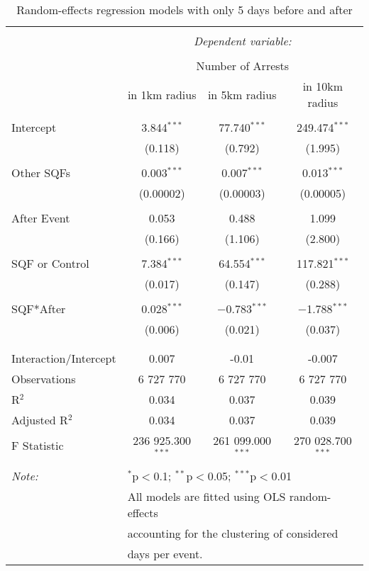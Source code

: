 
\begin{table}[!htbp] \centering 
  \caption{Random-effects regression models with only 5 days before and after} 
  \label{} 
\footnotesize 
\begin{tabular}{@{\extracolsep{4pt}}lccc} 
\\[-1.8ex]\hline 
\hline \\[-1.8ex] 
 & \multicolumn{3}{c}{\textit{Dependent variable:}} \\ 
\cline{2-4} 
\\[-1.8ex] & \multicolumn{3}{c}{Number of Arrests \vspace*{0.2cm}} \\ 
 & in 1km radius & in 5km radius & in 10km radius \\ 
\hline \\[-1.8ex] 
 Intercept & 3.844$^{***}$ & 77.740$^{***}$ & 249.474$^{***}$ \\ 
  & (0.118) & (0.792) & (1.995) \\ 
  & & & \\ 
 Other SQFs & 0.003$^{***}$ & 0.007$^{***}$ & 0.013$^{***}$ \\ 
  & (0.00002) & (0.00003) & (0.00005) \\ 
  & & & \\ 
 After Event & 0.053 & 0.488 & 1.099 \\ 
  & (0.166) & (1.106) & (2.800) \\ 
  & & & \\ 
 SQF or Control & 7.384$^{***}$ & 64.554$^{***}$ & 117.821$^{***}$ \\ 
  & (0.017) & (0.147) & (0.288) \\ 
  & & & \\ 
 SQF*After & 0.028$^{***}$ & $-$0.783$^{***}$ & $-$1.788$^{***}$ \\ 
  & (0.006) & (0.021) & (0.037) \\ 
  & & & \\ 
\hline \\[-1.8ex] 
Interaction/Intercept & 0.007 & -0.01 & -0.007 \\ 
Observations & 6 727 770 & 6 727 770 & 6 727 770 \\ 
R$^{2}$ & 0.034 & 0.037 & 0.039 \\ 
Adjusted R$^{2}$ & 0.034 & 0.037 & 0.039 \\ 
F Statistic & 236 925.300$^{***}$ & 261 099.000$^{***}$ & 270 028.700$^{***}$ \\ 
\hline 
\hline \\[-1.8ex] 
\textit{Note:}  & \multicolumn{3}{l}{$^{*}$p$<$0.1; $^{**}$p$<$0.05; $^{***}$p$<$0.01} \\ 
 & \multicolumn{3}{l}{All models are fitted using OLS random-effects} \\ 
 & \multicolumn{3}{l}{accounting for the clustering of considered} \\ 
 & \multicolumn{3}{l}{days per event.} \\ 
\end{tabular} 
\end{table} 
